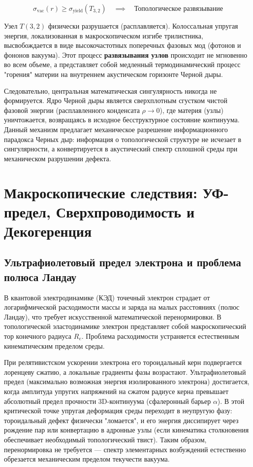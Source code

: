 \documentclass[12pt,a4paper]{article}
\begin{document}
	\begin{equation}
		\sigma_{\text{vac}}(r) \ge \sigma_{\text{yield}}(T_{3,2}) \quad \implies \quad \text{Топологическое развязывание}
	\end{equation}
	
	Узел $T(3,2)$ физически разрушается (расплавляется). Колоссальная упругая энергия, локализованная в макроскопическом изгибе трилистника, высвобождается в виде высокочастотных поперечных фазовых мод (фотонов и фононов вакуума). 
	Этот процесс \textbf{развязывания узлов} происходит не мгновенно во всем объеме, а представляет собой медленный термодинамический процесс "горения" материи на внутреннем акустическом горизонте Черной дыры. 
	
	Следовательно, центральная математическая сингулярность никогда не формируется. Ядро Черной дыры является сверхплотным сгустком чистой фазовой энергии (расплавленного конденсата $\rho \to 0$), где материя (узлы) уничтожается, возвращаясь в исходное бесструктурное состояние континуума. Данный механизм предлагает механическое разрешение информационного парадокса Черных дыр: информация о топологической структуре не исчезает в сингулярности, а конвертируется в акустический спектр сплошной среды при механическом разрушении дефекта.
	
	\section{Макроскопические следствия: УФ-предел, Сверхпроводимость и Декогеренция}
	
	\subsection{Ультрафиолетовый предел электрона и проблема полюса Ландау}
	В квантовой электродинамике (КЭД) точечный электрон страдает от логарифмической расходимости массы и заряда на малых расстояниях (полюс Ландау), что требует искусственной математической перенормировки. В топологической эластодинамике электрон представляет собой макроскопический тор конечного радиуса $R_e$. Проблема расходимости устраняется естественным кинематическим пределом среды.
	
	При релятивистском ускорении электрона его тороидальный керн подвергается лоренцеву сжатию, а локальные градиенты фазы возрастают. Ультрафиолетовый предел (максимально возможная энергия изолированного электрона) достигается, когда амплитуда упругих напряжений на сжатом радиусе керна превышает абсолютный предел прочности 3D-континуума (сфалеронный барьер $\alpha$). 
	В этой критической точке упругая деформация среды переходит в неупругую фазу: тороидальный дефект физически "ломается", и его энергия диссипирует через рождение пар или конвертацию в адронные узлы (если кинематика столкновения обеспечивает необходимый топологический твист). Таким образом, перенормировка не требуется — спектр элементарных возбуждений естественно обрезается механическим пределом текучести вакуума.
	
\end{document}
